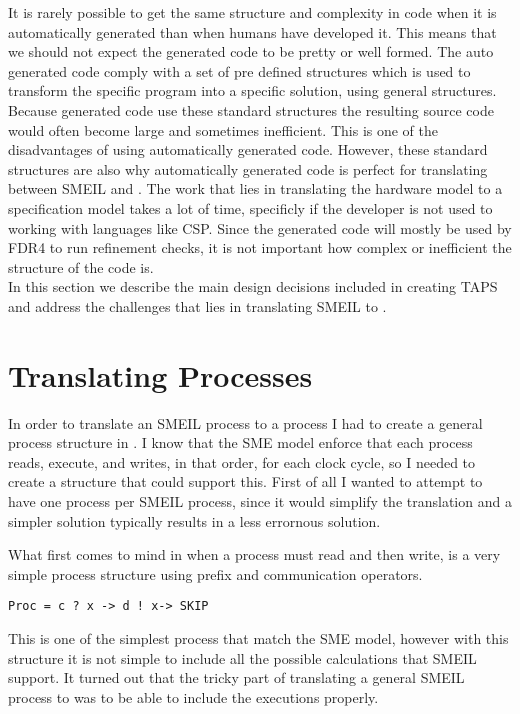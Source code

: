 It is rarely possible to get the same structure and complexity in code when it is automatically generated than when humans have developed it. This means that we should not expect the generated code to be pretty or well formed. The auto generated code comply with a set of pre defined structures which is used to transform the specific program into a specific solution, using general structures. Because generated code use these standard structures the resulting source code would often become large and sometimes inefficient. This is one of the disadvantages of using automatically generated code. However, these standard structures are also why automatically generated code is perfect for translating between SMEIL and \cspm{}. The work that lies in translating the hardware model to a specification model takes a lot of time, specificly if the developer is not used to working with languages like CSP. Since the generated code will mostly be used by FDR4 to run refinement checks, it is not important how complex or inefficient the structure of the code is. \\

In this section we describe the main design decisions included in creating TAPS and address the challenges that lies in translating SMEIL to \cspm{}.
\section{Translating Processes}
In order to translate an SMEIL process to a \cspm{} process I had to create a general process structure in \cspm{}. I know that the SME model enforce that each process reads, execute, and writes, in that order, for each clock cycle, so I needed to create a \cspm{} structure that could support this. First of all I wanted to attempt to have one \cspm{} process per SMEIL process, since it would simplify the translation and a simpler solution typically results in a less errornous solution.

What first comes to mind in \cspm{} when a process must read and then write, is a very simple process structure using prefix and communication operators.
\begin{verbatim}
Proc = c ? x -> d ! x-> SKIP
\end{verbatim}
This is one of the simplest \cspm{} process that match the SME model, however with this structure it is not simple to include all the possible calculations that SMEIL support. It turned out that the tricky part of translating a general SMEIL process to \cspm{} was to be able to include the executions properly.

